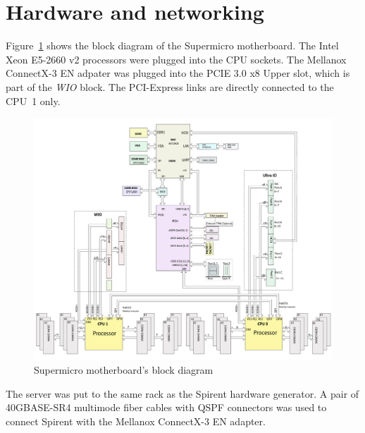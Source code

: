 
\section{Hardware and networking}\label{sec:setup-hardware}
Figure~\ref{fig:setup-supermicro-board} shows the block diagram of the Supermicro motherboard.
The Intel Xeon E5-2660 v2 processors were plugged into the CPU sockets.
The Mellanox ConnectX-3 EN adpater was plugged into the PCIE 3.0 x8 Upper slot,
which is part of the {\it{WIO}} block.
The PCI-Express links are directly connected to the CPU~1 only.
\begin{figure}
	\centering
	\includegraphics[width=15cm,keepaspectratio]{fig/supermicro-x10drui.png}
	\caption{Supermicro motherboard's block diagram}
	\label{fig:setup-supermicro-board}
\end{figure}

The server was put to the same rack as the Spirent hardware generator.
A pair of 40GBASE-SR4 multimode fiber cables with QSPF connectors
was used to connect Spirent with the Mellanox ConnectX-3 EN adapter.

